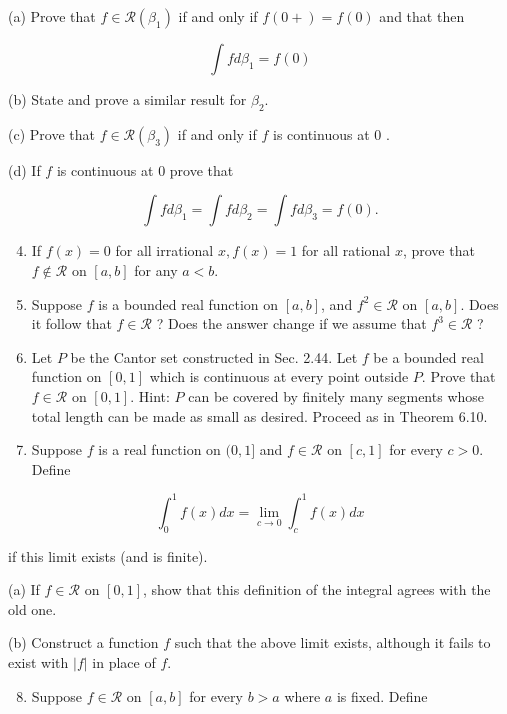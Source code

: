\documentclass[10pt]{article}
\begin{document}
(a) Prove that $f \in \mathscr{R}\left(\beta_{1}\right)$ if and only if $f(0+)=f(0)$ and that then

$$
\int f d \beta_{1}=f(0)
$$

(b) State and prove a similar result for $\beta_{2}$.

(c) Prove that $f \in \mathscr{R}\left(\beta_{3}\right)$ if and only if $f$ is continuous at 0 .

(d) If $f$ is continuous at 0 prove that

$$
\int f d \beta_{1}=\int f d \beta_{2}=\int f d \beta_{3}=f(0) .
$$

\begin{enumerate}
  \setcounter{enumi}{3}
  \item If $f(x)=0$ for all irrational $x, f(x)=1$ for all rational $x$, prove that $f \notin \mathscr{R}$ on $[a, b]$ for any $a<b$.

  \item Suppose $f$ is a bounded real function on $[a, b]$, and $f^{2} \in \mathscr{R}$ on $[a, b]$. Does it follow that $f \in \mathscr{R}$ ? Does the answer change if we assume that $f^{3} \in \mathscr{R}$ ?

  \item Let $P$ be the Cantor set constructed in Sec. 2.44. Let $f$ be a bounded real function on $[0,1]$ which is continuous at every point outside $P$. Prove that $f \in \mathscr{R}$ on $[0,1]$. Hint: $P$ can be covered by finitely many segments whose total length can be made as small as desired. Proceed as in Theorem 6.10.

  \item Suppose $f$ is a real function on $(0,1]$ and $f \in \mathscr{R}$ on $[c, 1]$ for every $c>0$. Define

\end{enumerate}

$$
\int_{0}^{1} f(x) d x=\lim _{c \rightarrow 0} \int_{c}^{1} f(x) d x
$$

if this limit exists (and is finite).

(a) If $f \in \mathscr{R}$ on $[0,1]$, show that this definition of the integral agrees with the old one.

(b) Construct a function $f$ such that the above limit exists, although it fails to exist with $|f|$ in place of $f$.

\begin{enumerate}
  \setcounter{enumi}{7}
  \item Suppose $f \in \mathscr{R}$ on $[a, b]$ for every $b>a$ where $a$ is fixed. Define
\end{enumerate}
\end{document}
